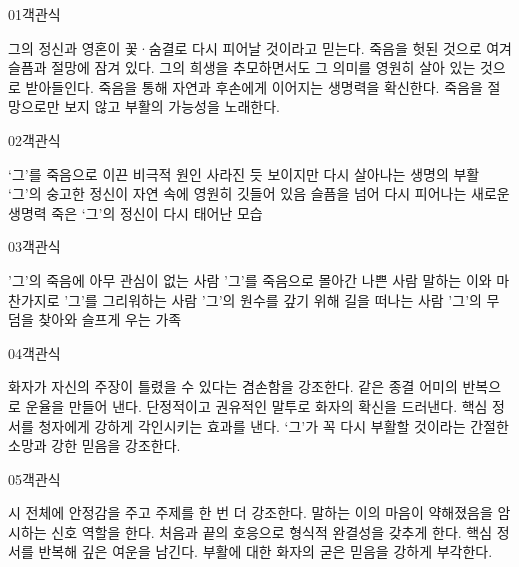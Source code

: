 \documentclass[fs85,seriesRus]{korfarm-base}
\begin{document}
\par\medskip
\kfBeginMC
\begin{kfQBlock}{01}{객관식}
\begin{kfChoices}
\kfChoice 그의 정신과 영혼이 꽃·숨결로 다시 피어날 것이라고 믿는다.
\kfChoice 죽음을 헛된 것으로 여겨 슬픔과 절망에 잠겨 있다.
\kfChoice 그의 희생을 추모하면서도 그 의미를 영원히 살아 있는 것으로 받아들인다.
\kfChoice 죽음을 통해 자연과 후손에게 이어지는 생명력을 확신한다.
\kfChoice 죽음을 절망으로만 보지 않고 부활의 가능성을 노래한다.
\end{kfChoices}
\end{kfQBlock}
\begin{kfQBlock}{02}{객관식}
\begin{kfChoices}
\kfChoice ‘그’를 죽음으로 이끈 비극적 원인
\kfChoice 사라진 듯 보이지만 다시 살아나는 생명의 부활
\kfChoice ‘그’의 숭고한 정신이 자연 속에 영원히 깃들어 있음
\kfChoice 슬픔을 넘어 다시 피어나는 새로운 생명력
\kfChoice 죽은 ‘그’의 정신이 다시 태어난 모습
\end{kfChoices}
\end{kfQBlock}
\begin{kfQBlock}{03}{객관식}
\begin{kfChoices}
\kfChoice '그'의 죽음에 아무 관심이 없는 사람
\kfChoice '그'를 죽음으로 몰아간 나쁜 사람
\kfChoice 말하는 이와 마찬가지로 '그'를 그리워하는 사람
\kfChoice '그'의 원수를 갚기 위해 길을 떠나는 사람
\kfChoice '그'의 무덤을 찾아와 슬프게 우는 가족
\end{kfChoices}
\end{kfQBlock}
\begin{kfQBlock}{04}{객관식}
\begin{kfChoices}
\kfChoice 화자가 자신의 주장이 틀렸을 수 있다는 겸손함을 강조한다.
\kfChoice 같은 종결 어미의 반복으로 운율을 만들어 낸다.
\kfChoice 단정적이고 권유적인 말투로 화자의 확신을 드러낸다.
\kfChoice 핵심 정서를 청자에게 강하게 각인시키는 효과를 낸다.
\kfChoice ‘그’가 꼭 다시 부활할 것이라는 간절한 소망과 강한 믿음을 강조한다.
\end{kfChoices}
\end{kfQBlock}
\begin{kfQBlock}{05}{객관식}
\begin{kfChoices}
\kfChoice 시 전체에 안정감을 주고 주제를 한 번 더 강조한다.
\kfChoice 말하는 이의 마음이 약해졌음을 암시하는 신호 역할을 한다.
\kfChoice 처음과 끝의 호응으로 형식적 완결성을 갖추게 한다.
\kfChoice 핵심 정서를 반복해 깊은 여운을 남긴다.
\kfChoice 부활에 대한 화자의 굳은 믿음을 강하게 부각한다.
\end{kfChoices}
\end{kfQBlock}
\end{document}
